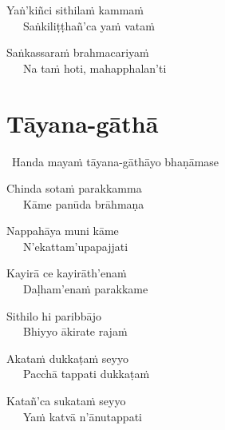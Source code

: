 \begin{hanging-indent}
Yaṅ'kiñci sithilaṁ kammaṁ\\
Saṅkiliṭṭhañ'ca yaṁ vataṁ
\end{hanging-indent}

\begin{hanging-indent}
Saṅkassaraṁ brahmacariyaṁ\\
Na taṁ hoti, mahapphalan'ti
\end{hanging-indent}

\suttaRef{[SN 2.8]}

\clearpage



\section{Tāyana-gāthā}
\label{tayana-gatha}

\begin{intro}
	\anglebracketleft\ \hspace{-0.5mm}Handa mayaṁ tāyana-gāthāyo bhaṇāmase \hspace{-0.5mm}\anglebracketright\
\end{intro}


\begin{hanging-indent}
Chinda sotaṁ parakkamma\\
Kāme panūda brāhmaṇa
\end{hanging-indent}

\begin{hanging-indent}
Nappahāya muni kāme\\
N'ekattam'upapajjati
\end{hanging-indent}

\begin{hanging-indent}
Kayirā ce kayirāth'enaṁ\\
Daḷham'enaṁ parakkame
\end{hanging-indent}

\begin{hanging-indent}
Sithilo hi paribbājo\\
Bhiyyo ākirate rajaṁ
\end{hanging-indent}

\begin{hanging-indent}
Akataṁ dukkaṭaṁ seyyo\\
Pacchā tappati dukkaṭaṁ
\end{hanging-indent}

\begin{hanging-indent}
Katañ'ca sukataṁ seyyo\\
Yaṁ katvā n'ānutappati
\end{hanging-indent}

